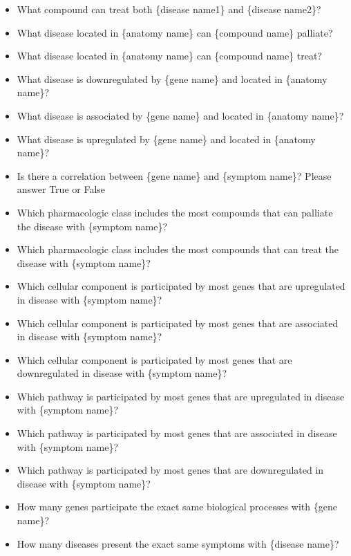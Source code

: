 \documentclass[11pt,UTF8,fontset=fandol]{ctexart}
\begin{document}
\begin{itemize}[leftmargin=1.4em,nosep]
\item What compound can treat both \{disease name1\} and \{disease name2\}?
\item What disease located in \{anatomy name\} can \{compound name\} palliate?
\item What disease located in \{anatomy name\} can \{compound name\} treat?
\item What disease is downregulated by \{gene name\} and located in \{anatomy name\}?
\item What disease is associated by \{gene name\} and located in \{anatomy name\}?
\item What disease is upregulated by \{gene name\} and located in \{anatomy name\}?
\item Is there a correlation between \{gene name\} and \{symptom name\}? Please answer True or False
\item Which pharmacologic class includes the most compounds that can palliate the disease with \{symptom name\}?
\item Which pharmacologic class includes the most compounds that can treat the disease with \{symptom name\}?
\item Which cellular component is participated by most genes that are upregulated in disease with \{symptom name\}?
\item Which cellular component is participated by most genes that are associated in disease with \{symptom name\}?
\item Which cellular component is participated by most genes that are downregulated in disease with \{symptom name\}?
\item Which pathway is participated by most genes that are upregulated in disease with \{symptom name\}?
\item Which pathway is participated by most genes that are associated in disease with \{symptom name\}?
\item Which pathway is participated by most genes that are downregulated in disease with \{symptom name\}?
\item How many genes participate the exact same biological processes with \{gene name\}?
\item How many diseases present the exact same symptoms with \{disease name\}?
\end{itemize}
\end{document}
